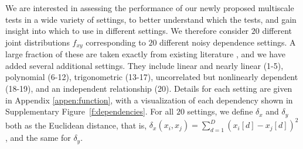 \documentclass[11pt]{article}
\providecommand{\sct}[1]{{\sc \texttt{#1}}}
\newcommand{\Mgc}{\sct{Mgc}}
\newcommand{\Mgcm}{\sct{Mgc$_M$}}
\newcommand{\Hhg}{\sct{Hhg}}
\newcommand{\Dcorr}{\sct{Dcorr}}
\newcommand{\Mcorr}{\sct{Mcorr}}
\newcommand{\Mantel}{\sct{Mantel}}
\begin{document}
We are interested in assessing the performance of our newly proposed multiscale tests in a wide variety of settings, to better understand which the tests, and gain insight into which to use in different settings.  
We therefore consider $20$ different joint distributions $f_{xy}$ corresponding to $20$ different noisy dependence settings. A large fraction of these are taken exactly from existing literature \cite{SzekelyRizzoBakirov2007, SimonTibshirani2012, GorfineHellerHeller2012, HellerGorfine2013}, and we have added several additional settings.  They include
linear and nearly linear  (1-5),
polynomial   (6-12),
trigonometric (13-17),
uncorrelated but nonlinearly dependent  (18-19),
and an independent relationship (20).
Details for each setting are given in Appendix \ref{appen:function}, with a visualization of each dependency shown in Supplementary Figure~\ref{f:dependencies}. For all $20$ settings, we define  $\delta_x$ and $\delta_y$ both as the Euclidean distance, that is, $\delta_x(x_i,x_j) = \sum_{d=1}^{D} (x_i[d] - x_j[d])^2$, and the same for $\delta_y$.
\end{document}
